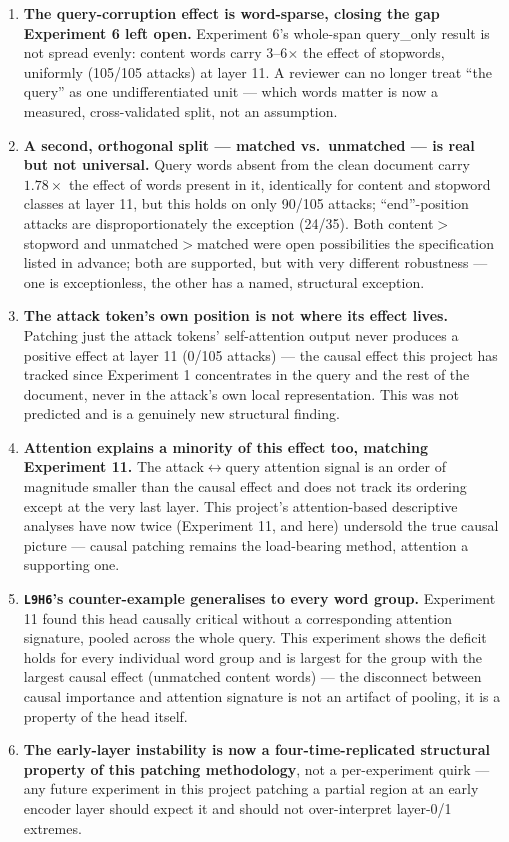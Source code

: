 \documentclass[11pt]{article}
\begin{document}
\begin{enumerate}
  \item \textbf{The query-corruption effect is word-sparse, closing the gap Experiment 6
  left open.} Experiment 6's whole-span query\_only result is not spread evenly: content
  words carry 3--6$\times$ the effect of stopwords, uniformly (105/105 attacks) at layer
  11. A reviewer can no longer treat ``the query'' as one undifferentiated unit — which
  words matter is now a measured, cross-validated split, not an assumption.
  \item \textbf{A second, orthogonal split — matched vs.\ unmatched — is real but not
  universal.} Query words absent from the clean document carry $1.78\times$ the effect of
  words present in it, identically for content and stopword classes at layer 11, but this
  holds on only 90/105 attacks; ``end''-position attacks are disproportionately the
  exception (24/35). Both content$>$stopword and unmatched$>$matched were open
  possibilities the specification listed in advance; both are supported, but with very
  different robustness — one is exceptionless, the other has a named, structural
  exception.
  \item \textbf{The attack token's own position is not where its effect lives.} Patching
  just the attack tokens' self-attention output never produces a positive effect at layer
  11 (0/105 attacks) — the causal effect this project has tracked since Experiment 1
  concentrates in the query and the rest of the document, never in the attack's own local
  representation. This was not predicted and is a genuinely new structural finding.
  \item \textbf{Attention explains a minority of this effect too, matching Experiment
  11.} The attack$\leftrightarrow$query attention signal is an order of magnitude smaller
  than the causal effect and does not track its ordering except at the very last layer.
  This project's attention-based descriptive analyses have now twice (Experiment 11, and
  here) undersold the true causal picture — causal patching remains the load-bearing
  method, attention a supporting one.
  \item \textbf{\texttt{L9H6}'s counter-example generalises to every word group.}
  Experiment 11 found this head causally critical without a corresponding attention
  signature, pooled across the whole query. This experiment shows the deficit holds for
  every individual word group and is largest for the group with the largest causal effect
  (unmatched content words) — the disconnect between causal importance and attention
  signature is not an artifact of pooling, it is a property of the head itself.
  \item \textbf{The early-layer instability is now a four-time-replicated structural
  property of this patching methodology}, not a per-experiment quirk — any future
  experiment in this project patching a partial region at an early encoder layer should
  expect it and should not over-interpret layer-0/1 extremes.
\end{enumerate}
\end{document}
